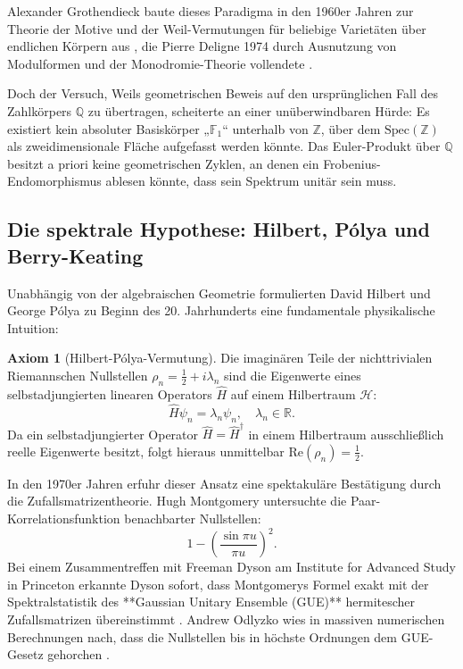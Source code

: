 \documentclass[11pt,a4paper]{article}
\theoremstyle{definition}
\newtheorem{axiom}[theorem]{Axiom}
\theoremstyle{remark}
\numberwithin{equation}{section}
\begin{document}
Alexander Grothendieck baute dieses Paradigma in den 1960er Jahren zur Theorie der Motive und der Weil-Vermutungen für beliebige Varietäten über endlichen Körpern aus \cite{Grothendieck1968}, die Pierre Deligne 1974 durch Ausnutzung von Modulformen und der Monodromie-Theorie vollendete \cite{Deligne1974}.

Doch der Versuch, Weils geometrischen Beweis auf den ursprünglichen Fall des Zahlkörpers $\mathbb{Q}$ zu übertragen, scheiterte an einer unüberwindbaren Hürde: Es existiert kein absoluter Basiskörper „$\mathbb{F}_1$“ unterhalb von $\mathbb{Z}$, über dem $\mathrm{Spec}(\mathbb{Z})$ als zweidimensionale Fläche aufgefasst werden könnte. Das Euler-Produkt über $\mathbb{Q}$ besitzt a priori keine geometrischen Zyklen, an denen ein Frobenius-Endomorphismus ablesen könnte, dass sein Spektrum unitär sein muss.

\subsection{Die spektrale Hypothese: Hilbert, Pólya und Berry-Keating}

Unabhängig von der algebraischen Geometrie formulierten David Hilbert und George Pólya zu Beginn des 20. Jahrhunderts eine fundamentale physikalische Intuition:
\begin{axiom}[Hilbert-Pólya-Vermutung]
Die imaginären Teile der nichttrivialen Riemannschen Nullstellen $\rho_n = \frac{1}{2} + i \lambda_n$ sind die Eigenwerte eines selbstadjungierten linearen Operators $\hat{H}$ auf einem Hilbertraum $\mathcal{H}$:
\begin{equation}
\hat{H} \psi_n = \lambda_n \psi_n, \quad \lambda_n \in \mathbb{R}.
\end{equation}
Da ein selbstadjungierter Operator $\hat{H} = \hat{H}^\dagger$ in einem Hilbertraum ausschließlich reelle Eigenwerte besitzt, folgt hieraus unmittelbar $\mathrm{Re}(\rho_n) = \frac{1}{2}$.
\end{axiom}

In den 1970er Jahren erfuhr dieser Ansatz eine spektakuläre Bestätigung durch die Zufallsmatrizentheorie. Hugh Montgomery untersuchte die Paar-Korrelationsfunktion benachbarter Nullstellen:
\begin{equation}
1 - \left(\frac{\sin \pi u}{\pi u}\right)^2.
\end{equation}
Bei einem Zusammentreffen mit Freeman Dyson am Institute for Advanced Study in Princeton erkannte Dyson sofort, dass Montgomerys Formel exakt mit der Spektralstatistik des **Gaussian Unitary Ensemble (GUE)** hermitescher Zufallsmatrizen übereinstimmt \cite{Montgomery1973}. Andrew Odlyzko wies in massiven numerischen Berechnungen nach, dass die Nullstellen bis in höchste Ordnungen dem GUE-Gesetz gehorchen \cite{Odlyzko1987}.
\end{document}
